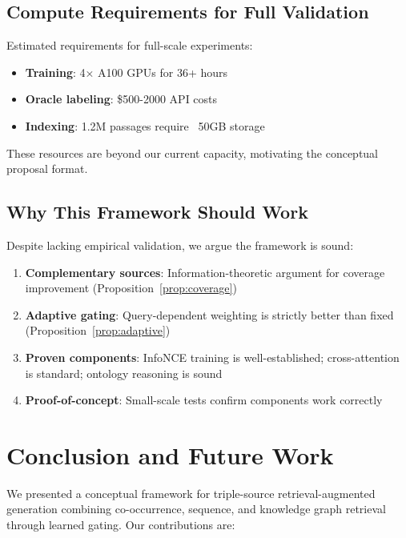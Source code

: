 \documentclass[10pt,twocolumn]{article}
\begin{document}
\subsection{Compute Requirements for Full Validation}

Estimated requirements for full-scale experiments:
\begin{itemize}
    \item \textbf{Training}: 4× A100 GPUs for 36+ hours
    \item \textbf{Oracle labeling}: \$500-2000 API costs
    \item \textbf{Indexing}: 1.2M passages require ~50GB storage
\end{itemize}

These resources are beyond our current capacity, motivating the conceptual proposal format.

\subsection{Why This Framework Should Work}

Despite lacking empirical validation, we argue the framework is sound:

\begin{enumerate}
    \item \textbf{Complementary sources}: Information-theoretic argument for coverage improvement (Proposition~\ref{prop:coverage})
    
    \item \textbf{Adaptive gating}: Query-dependent weighting is strictly better than fixed (Proposition~\ref{prop:adaptive})
    
    \item \textbf{Proven components}: InfoNCE training is well-established; cross-attention is standard; ontology reasoning is sound
    
    \item \textbf{Proof-of-concept}: Small-scale tests confirm components work correctly
\end{enumerate}

\section{Conclusion and Future Work}

We presented a conceptual framework for triple-source retrieval-augmented generation combining co-occurrence, sequence, and knowledge graph retrieval through learned gating. Our contributions are:
\end{document}
